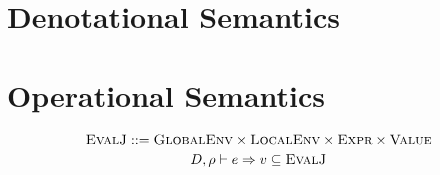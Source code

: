 \documentclass{article}
\def\code#1{\texttt{#1}}
\def\rt{\Rightarrow}
\def\envj#1#2#3{D, #1 \vdash #2 \rt #3}
\begin{document}
\pagebreak


\pagebreak
\section*{Denotational Semantics}


\section*{Operational Semantics}

$$
\textsc{EvalJ} ::= \textsc{GlobalEnv} \times \textsc{LocalEnv} \times \textsc{Expr} \times \textsc{Value}
$$
$$
\envj{\rho}{e}{v}\subseteq \textsc{EvalJ}
$$

\

\
\end{document}
